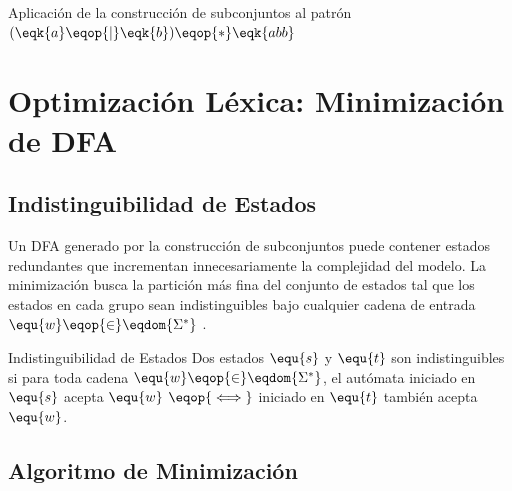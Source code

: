 \begin{ejemplo}{Aplicación de la construcción de subconjuntos al patrón $(\eqk{a} \eqop{\mid} \eqk{b})\eqop{*} \eqk{abb}$}
\begin{center}
  \label{fig:dfa-subset}
\end{center}
\end{ejemplo}

\section{Optimización Léxica: Minimización de DFA}
\label{sec:2_5_minimizacion}

\subsection{Indistinguibilidad de Estados}
Un DFA generado por la construcción de subconjuntos puede contener estados redundantes que incrementan innecesariamente la complejidad del modelo. La minimización busca la partición más fina del conjunto de estados tal que los estados en cada grupo sean indistinguibles bajo cualquier cadena de entrada $\equ{w} \eqop{\in} \eqdom{\Sigma^*}$ \cite{sipser2012introduction}.

\begin{proposicion}{Indistinguibilidad de Estados}
Dos estados $\equ{s}$ y $\equ{t}$ son indistinguibles si para toda cadena $\equ{w} \eqop{\in} \eqdom{\Sigma^*}$, el autómata iniciado en $\equ{s}$ acepta $\equ{w}$ $\eqop{\iff}$ iniciado en $\equ{t}$ también acepta $\equ{w}$.
\end{proposicion}

\subsection{Algoritmo de Minimización}

